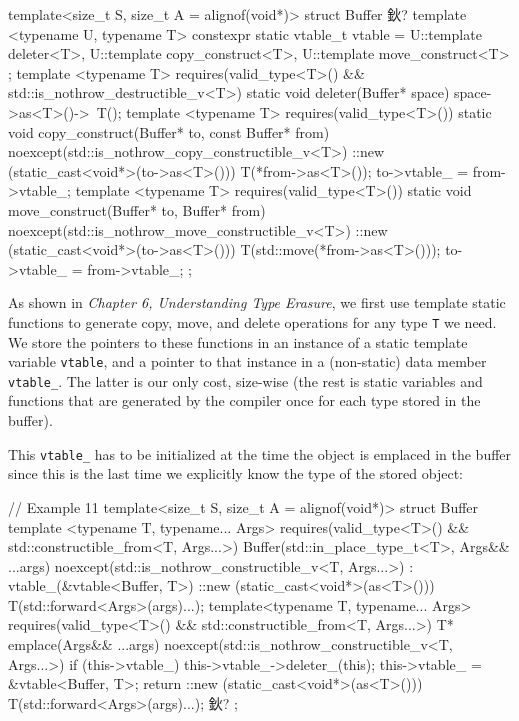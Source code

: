 \begin{code}
template<size_t S, size_t A = alignof(void*)>
struct Buffer {
  鈥?
  template <typename U, typename T>
  constexpr static vtable_t vtable = {
    U::template deleter<T>,
    U::template copy_construct<T>,
    U::template move_construct<T>
  };
  template <typename T>
    requires(valid_type<T>() &&
    std::is_nothrow_destructible_v<T>)
  static void deleter(Buffer* space) {
    space->as<T>()->~T();
  }
  template <typename T>
    requires(valid_type<T>())
  static void copy_construct(Buffer* to,
                             const Buffer* from)
    noexcept(std::is_nothrow_copy_constructible_v<T>)
  {
    ::new (static_cast<void*>(to->as<T>()))
      T(*from->as<T>());
    to->vtable_ = from->vtable_;
  }
  template <typename T>
    requires(valid_type<T>())
    static void move_construct(Buffer* to, Buffer* from)
    noexcept(std::is_nothrow_move_constructible_v<T>)
  {
    ::new (static_cast<void*>(to->as<T>()))
      T(std::move(*from->as<T>()));
    to->vtable_ = from->vtable_;
  }
};
\end{code}

As shown in \emph{Chapter 6, Understanding Type Erasure}, we first use template static functions to generate copy, move, and delete operations for any type \texttt{T} we need. We store the pointers to these functions in an instance of a static template variable \texttt{vtable}, and a pointer to that instance in a (non-static) data member \texttt{vtable\_}. The latter is our only cost, size-wise (the rest is static variables and functions that are generated by the compiler once for each type stored in the buffer).

This \texttt{vtable\_} has to be initialized at the time the object is emplaced in the buffer since this is the last time we explicitly know the type of the stored object:

\begin{code}
// Example 11
template<size_t S, size_t A = alignof(void*)>
struct Buffer {
  template <typename T, typename... Args>
    requires(valid_type<T>() &&
    std::constructible_from<T, Args...>)
  Buffer(std::in_place_type_t<T>, Args&& ...args)
    noexcept(std::is_nothrow_constructible_v<T, Args...>)
    : vtable_(&vtable<Buffer, T>)
  {
    ::new (static_cast<void*>(as<T>()))
      T(std::forward<Args>(args)...);
  }
  template<typename T, typename... Args>
    requires(valid_type<T>() &&
    std::constructible_from<T, Args...>)
  T* emplace(Args&& ...args)
    noexcept(std::is_nothrow_constructible_v<T, Args...>)
  {
    if (this->vtable_) this->vtable_->deleter_(this);
    this->vtable_ = &vtable<Buffer, T>;
    return ::new (static_cast<void*>(as<T>()))
      T(std::forward<Args>(args)...);
  }
  鈥?
};
\end{code}

